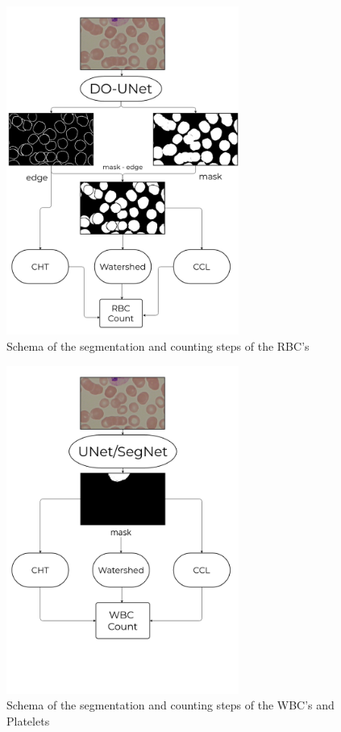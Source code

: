 \documentclass[conference]{IEEEtran}
\begin{document}
\begin{figure}[H]
\centering
  \vspace{-0.1in}
    \centerline{\includegraphics[width = 3in]{images/Diag_RBC_DOUNET_SegNet.png}}
    \caption{Schema of the segmentation and counting steps of the RBC's}
    \label{fig:scheme_RBC}
\end{figure}

\begin{figure}[H]
\centering
    \centerline{\includegraphics[width = 3in]{images/Diag_WBC_PLT_UNET_SegNet.png}}
    \caption{Schema of the segmentation and counting steps of the WBC's and Platelets}
    \label{fig:scheme_WBC_PLT}
\end{figure}
\end{document}
